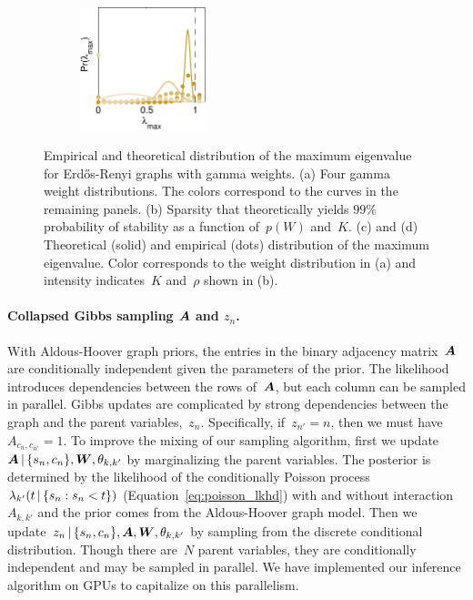 \begin{figure}[!ht]
\begin{center}
\begin{subfigure}[b]{.23\textwidth}
\vspace{-.5em}
\includegraphics[height=1.4in]{figures/ch2/stability_8_12} 
\end{subfigure}
\end{center}
\vspace{-1em}
\caption{Empirical and theoretical distribution of the maximum eigenvalue for Erd\H{o}s-Renyi graphs with gamma weights. (a) Four gamma weight distributions. The colors correspond to the curves in the remaining panels. (b) Sparsity that theoretically yields ${99\%}$ probability of stability as a function of~${p(W)}$ and~$K$. (c) and (d) Theoretical (solid) and empirical (dots) distribution of the maximum eigenvalue. Color corresponds to the weight distribution in (a) and intensity indicates~$K$ and~$\rho$ shown in (b).}
\label{fig:stability}
\vspace{-1em}
\end{figure}

\paragraph{Collapsed Gibbs sampling $\boldsymbol{A}$ and $z_n$.}
With Aldous-Hoover graph priors, the entries in the binary adjacency matrix~$\boldsymbol{A}$ are conditionally independent given the parameters of the prior. The likelihood introduces dependencies between the rows of~$\boldsymbol{A}$, but each column can be sampled in parallel. Gibbs updates are complicated by strong dependencies between the graph and the parent variables,~$z_n$. Specifically, if~${z_{n'}=n}$, then we must have~${A_{c_{n},c_{n'}}=1}$. To improve the mixing of our sampling algorithm, first we update~${\boldsymbol{A}\,|\,\{s_n,c_n\},\boldsymbol{W},\theta_{k,k'}}$ by marginalizing the parent variables. The posterior is determined by the likelihood of the conditionally Poisson process~${\lambda_{k'}(t\,|\,\{s_n:s_n<t\})}$ (Equation~\ref{eq:poisson_lkhd}) with and without interaction~${A_{k,k'}}$ and the prior comes from the Aldous-Hoover graph model. Then we update~${z_n\,|\,\{s_n,c_n\},\boldsymbol{A},\boldsymbol{W},\theta_{k,k'}}$ by sampling from the discrete conditional distribution. Though there are~$N$ parent variables, they are conditionally independent and may be sampled in parallel. We have implemented our inference algorithm on GPUs to capitalize on this parallelism.

